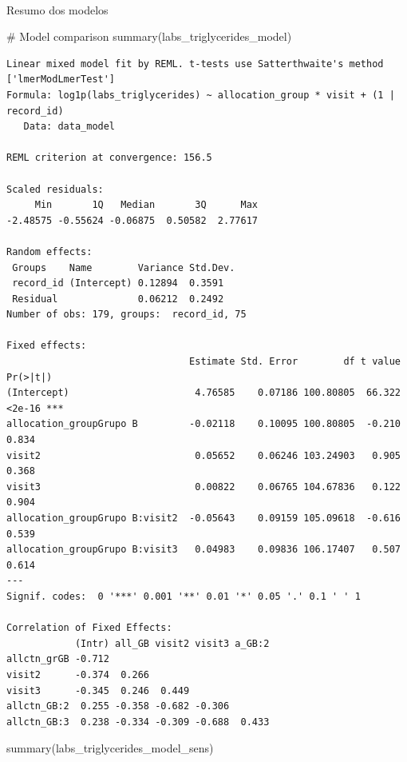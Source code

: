 \documentclass[
  12pt,
]{article}
\makeatletter
\let\oldparagraph\paragraph
\renewcommand{\paragraph}{
    \@ifstar
      \xxxParagraphStar
      \xxxParagraphNoStar
  }
\newcommand{\xxxParagraphStar}[1]{\oldparagraph*{#1}\mbox{}}
\newcommand{\xxxParagraphNoStar}[1]{\oldparagraph{#1}\mbox{}}
\newenvironment{Shaded}{\begin{snugshade}}{\end{snugshade}}
\newcommand{\CommentTok}[1]{\textcolor[rgb]{0.37,0.37,0.37}{#1}}
\newcommand{\FunctionTok}[1]{\textcolor[rgb]{0.28,0.35,0.67}{#1}}
\newcommand{\NormalTok}[1]{\textcolor[rgb]{0.00,0.23,0.31}{#1}}
\makeatother
\begin{document}
\paragraph{Resumo dos modelos}\label{resumo-dos-modelos-7}

\begin{Shaded}
\begin{Highlighting}[]
\CommentTok{\# Model comparison}
\FunctionTok{summary}\NormalTok{(labs\_triglycerides\_model)}
\end{Highlighting}
\end{Shaded}

\begin{verbatim}
Linear mixed model fit by REML. t-tests use Satterthwaite's method ['lmerModLmerTest']
Formula: log1p(labs_triglycerides) ~ allocation_group * visit + (1 | record_id)
   Data: data_model

REML criterion at convergence: 156.5

Scaled residuals: 
     Min       1Q   Median       3Q      Max 
-2.48575 -0.55624 -0.06875  0.50582  2.77617 

Random effects:
 Groups    Name        Variance Std.Dev.
 record_id (Intercept) 0.12894  0.3591  
 Residual              0.06212  0.2492  
Number of obs: 179, groups:  record_id, 75

Fixed effects:
                                Estimate Std. Error        df t value Pr(>|t|)    
(Intercept)                      4.76585    0.07186 100.80805  66.322   <2e-16 ***
allocation_groupGrupo B         -0.02118    0.10095 100.80805  -0.210    0.834    
visit2                           0.05652    0.06246 103.24903   0.905    0.368    
visit3                           0.00822    0.06765 104.67836   0.122    0.904    
allocation_groupGrupo B:visit2  -0.05643    0.09159 105.09618  -0.616    0.539    
allocation_groupGrupo B:visit3   0.04983    0.09836 106.17407   0.507    0.614    
---
Signif. codes:  0 '***' 0.001 '**' 0.01 '*' 0.05 '.' 0.1 ' ' 1

Correlation of Fixed Effects:
            (Intr) all_GB visit2 visit3 a_GB:2
allctn_grGB -0.712                            
visit2      -0.374  0.266                     
visit3      -0.345  0.246  0.449              
allctn_GB:2  0.255 -0.358 -0.682 -0.306       
allctn_GB:3  0.238 -0.334 -0.309 -0.688  0.433
\end{verbatim}

\begin{Shaded}
\begin{Highlighting}[]
\FunctionTok{summary}\NormalTok{(labs\_triglycerides\_model\_sens)}
\end{Highlighting}
\end{Shaded}
\end{document}
